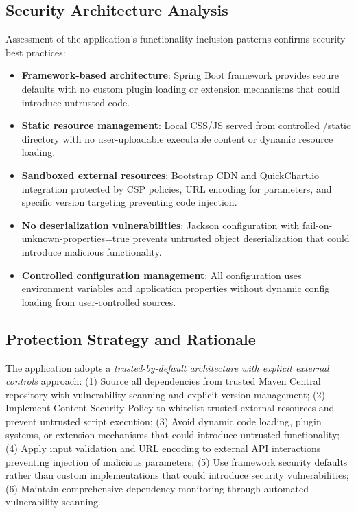 \documentclass[]{UCD_CS_FYP_Report}
\begin{document}
\subsection{Security Architecture Analysis}
Assessment of the application's functionality inclusion patterns confirms security best practices:
\begin{itemize}
	\item \textbf{Framework-based architecture}: Spring Boot framework provides secure defaults with no custom plugin loading or extension mechanisms that could introduce untrusted code.
	\item \textbf{Static resource management}: Local CSS/JS served from controlled /static directory with no user-uploadable executable content or dynamic resource loading.
	\item \textbf{Sandboxed external resources}: Bootstrap CDN and QuickChart.io integration protected by CSP policies, URL encoding for parameters, and specific version targeting preventing code injection.
	\item \textbf{No deserialization vulnerabilities}: Jackson configuration with fail-on-unknown-properties=true prevents untrusted object deserialization that could introduce malicious functionality.
	\item \textbf{Controlled configuration management}: All configuration uses environment variables and application properties without dynamic config loading from user-controlled sources.
\end{itemize}

\subsection{Protection Strategy and Rationale}
The application adopts a \textit{trusted-by-default architecture with explicit external controls} approach: (1) Source all dependencies from trusted Maven Central repository with vulnerability scanning and explicit version management; (2) Implement Content Security Policy to whitelist trusted external resources and prevent untrusted script execution; (3) Avoid dynamic code loading, plugin systems, or extension mechanisms that could introduce untrusted functionality; (4) Apply input validation and URL encoding to external API interactions preventing injection of malicious parameters; (5) Use framework security defaults rather than custom implementations that could introduce security vulnerabilities; (6) Maintain comprehensive dependency monitoring through automated vulnerability scanning.
\end{document}
